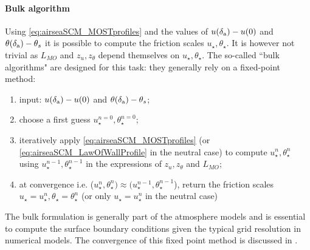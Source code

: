 \paragraph{Bulk algorithm}
Using \eqref{eq:airseaSCM_MOSTprofiles} and the values of
$u(\delta_{\rm a}) - u(0)$ and $\theta(\delta_{\rm a}) - \theta_s$
it is possible to compute the friction scales
$u_\star, \theta_\star$. It is however not trivial as
$L_{MO}$ and $z_u, z_\theta$ depend themselves on
$u_\star, \theta_\star$.
The so-called ``bulk algorithms" are designed for this
task: they generally rely on a fixed-point method:
\begin{enumerate}
\item input: $u(\delta_{\rm a}) - u(0)$
		and $\theta(\delta_{\rm a}) - \theta_s$;
\item choose a first guess $u_\star^{n=0}, \theta_\star^{n=0}$;
\item iteratively apply
	\eqref{eq:airseaSCM_MOSTprofiles} (or
	\eqref{eq:airseaSCM_LawOfWallProfile} in the neutral case)
	to compute $u_\star^{n}, \theta_\star^{n}$ using
	$u_\star^{n-1}, \theta_\star^{n-1}$
	in the expressions of $z_u, z_\theta$ and $L_{MO}$;
\item at convergence i.e. ($u_\star^{n},\theta_\star^{n}) \approx
	(u_\star^{n-1},\theta_\star^{n-1}$), return the friction
		scales $u_\star = u_\star^{n},
		\theta_\star = \theta_\star^{n}$ (or only
		$u_\star = u_\star^{n}$ in the neutral case)
\end{enumerate}
The bulk formulation is generally part of the atmosphere models and
is essential to compute the surface boundary conditions given the
typical grid resolution in numerical models.
The convergence of this fixed point method 
is discussed in \citep{thery_etude_2021}.
